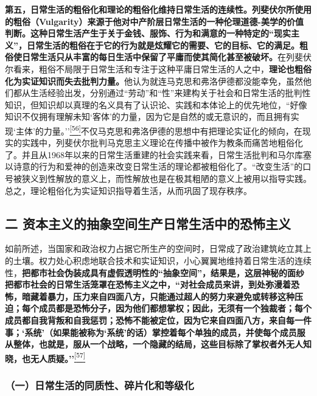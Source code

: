 \documentclass[UTF8, fontset = sourcesans, a4paper, oneside, zihao =
-4, scheme=chinese, no-math, space=true]{ctexbook}
\begin{document}
\textbf{第五，日常生活的粗俗化和理论的粗俗化维持日常生活的连续性。列斐伏尔所使用的粗俗（Vulgarity）来源于他对中产阶层日常生活的一种伦理道德-美学的价值判断。这种日常生活产生于关于金钱、服饰、行为和满意的一种特定的``现实主义''，日常生活的粗俗在于它的行为就是炫耀它的需要、它的目标、它的满足。粗俗使日常生活只从丰富的每日生活中保留了平庸而使其简化甚至被破坏。}在列斐伏尔看来，粗俗不局限于日常生活和专注于这种平庸日常生活的人之中，\textbf{理论也粗俗化为实证知识而失去批判力量。}他认为就连马克思和弗洛伊德都没能幸免，虽然他们都从生活经验出发，分别通过``劳动''和``性''来建构关于社会和日常生活的批判性知识，但知识却以真理的名义具有了认识论、实践和本体论上的优先地位，``好像知识不仅拥有理解未知`客体'的力量，因为它是自然的或无意识的，而且拥有实现`主体'的力量。''\protect\hypertarget{part0007_split_004.htmlux5cux23w56}{}{}\protect\hyperlink{part0007_split_004.htmlux5cux23m56}{\textsuperscript{{[}56{]}}}不仅马克思和弗洛伊德的思想中有把理论实证化的倾向，在现实的实践中，列斐伏尔批判马克思主义理论在传播中被作为教条而痛苦地粗俗化了。并且从1968年以来的日常生活重建的社会实践来看，日常生活批判和马尔库塞以诗意的行为和爱神的创造来改变日常生活的理论都被粗俗化了。``改变生活''的口号被狭义到性解放的意义上，而性解放也是在极其粗陋的意义上被用以指导实践。总之，理论粗俗化为实证知识指导着生活，从而巩固了现存秩序。

\subsection{二
资本主义的抽象空间生产日常生活中的恐怖主义}\label{part0007_split_004.htmlux5cux23c034}

如前所述，当国家和政治权力占据它所生产的空间时，日常成了政治建筑屹立其上的土壤。权力处心积虑地联合技术和实证知识，小心翼翼地维持着日常生活的连续性，\textbf{把都市社会伪装成具有虚假透明性的``抽象空间''，结果是，这层神秘的面纱把都市社会的日常生活笼罩在恐怖主义之中，``对社会成员来讲，到处弥漫着恐怖，暗藏着暴力，压力来自四面八方，只能通过超人的努力来避免或转移这种压迫；每个成员都是恐怖分子，因为他们都想掌权；因此，无须有一个独裁者；每个成员都自我背叛和自我惩罚；恐怖不能被定位，因为它来自四面八方，来自每一件事；`系统'（如果能被称为`系统'的话）掌控着每个单独的成员，并使每个成员服从整体，也就是，服从一个战略，一个隐藏的结局，这些目标除了掌权者外无人知晓，也无人质疑。''}\protect\hypertarget{part0007_split_004.htmlux5cux23w57}{}{}\protect\hyperlink{part0007_split_004.htmlux5cux23m57}{\textsuperscript{{[}57{]}}}

\subsubsection{（一）日常生活的同质性、碎片化和等级化}\label{part0007_split_004.htmlux5cux23d019}
\end{document}
